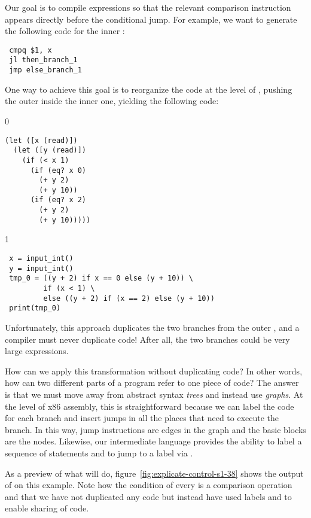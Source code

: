 \documentclass[7x10]{TimesAPriori_MIT}%
\def\racketEd{0}
\def\pythonEd{1}
\def\edition{1}
\newcommand{\pythonColor}[0]{}
\numberwithin{theorem}{chapter}
\numberwithin{definition}{chapter}
\numberwithin{equation}{chapter}
\begin{document}
Our goal is to compile  expressions so that the relevant
comparison instruction appears directly before the conditional jump.
For example, we want to generate the following code for the inner
:
\begin{center}
\begin{minipage}{0.96\textwidth}
\begin{lstlisting}
 cmpq $1, x
 jl then_branch_1
 jmp else_branch_1
\end{lstlisting}
\end{minipage}
\end{center}
One way to achieve this goal is to reorganize the code at the level of
\LangIfANF{}, pushing the outer  inside the inner one, yielding
the following code:
\begin{center}
\begin{minipage}{0.96\textwidth}
{\if\edition\racketEd        
\begin{lstlisting}
(let ([x (read)])
  (let ([y (read)])
    (if (< x 1) 
      (if (eq? x 0)
        (+ y 2)
        (+ y 10))
      (if (eq? x 2)
        (+ y 2)
        (+ y 10)))))
\end{lstlisting}
\fi}
{\if\edition\pythonEd\pythonColor
\begin{lstlisting}
 x = input_int()
 y = input_int()
 tmp_0 = ((y + 2) if x == 0 else (y + 10)) \
         if (x < 1) \
         else ((y + 2) if (x == 2) else (y + 10))
 print(tmp_0)
\end{lstlisting}
\fi}
\end{minipage}
\end{center}
Unfortunately, this approach duplicates the two branches from the
outer , and a compiler must never duplicate code!  After all,
the two branches could be very large expressions.

How can we apply this transformation without duplicating code? In
other words, how can two different parts of a program refer to one
piece of code?
%
The answer is that we must move away from abstract syntax \emph{trees}
and instead use \emph{graphs}.
%
At the level of x86 assembly, this is straightforward because we can
label the code for each branch and insert jumps in all the places that
need to execute the branch. In this way, jump instructions are edges
in the graph and the basic blocks are the nodes.
%
Likewise, our intermediate language \LangCIf{} provides the ability to
label a sequence of statements and to jump to a label via .

As a preview of what  will do,
figure~\ref{fig:explicate-control-s1-38} shows the output of
\code{explicate\_control} on this example. Note how the condition of
every \code{if} is a comparison operation and that we have not
duplicated any code but instead have used labels and \code{goto} to
enable sharing of code.
\end{document}
